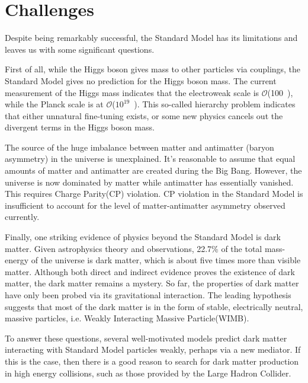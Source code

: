 \section{Challenges}
\par Despite being remarkably successful, the Standard Model has its limitations and leaves us with some significant questions.


\par First of all, while the Higgs boson gives mass to other particles via couplings, the Standard Model gives no prediction for
the Higgs boson mass. The current measurement of the Higgs mass indicates that the electroweak scale is $\mathcal{O}$(100~\GeV), 
while the Planck scale is at $\mathcal{O}$($10^{19}$~\GeV). This so-called hierarchy problem indicates that either unnatural fine-tuning exists, or some new physics cancels out the divergent terms in the Higgs boson mass.






\par The source of the huge imbalance between matter and antimatter (baryon asymmetry) in the universe is unexplained. 
It's reasonable to assume that equal amounts of matter and antimatter are created during the Big Bang. However, 
the universe is now dominated by matter while antimatter has essentially vanished. This requires Charge Parity(CP) violation.
CP violation in the Standard Model is insufficient to account for the level of matter-antimatter asymmetry observed currently.


\par Finally, one striking evidence of physics beyond the Standard Model is dark matter. Given astrophysics theory and observations, 
22.7\% of the total mass-energy of the universe is dark matter, which is about five times more than visible matter. 
Although both direct and indirect evidence proves the existence of dark matter, the dark matter remains a mystery. 
So far, the properties of dark matter have only been probed via its gravitational interaction. The leading hypothesis suggests that 
most of the dark matter is in the form of stable, electrically neutral, massive particles, i.e. Weakly Interacting Massive Particle(WIMB).


\par To answer these questions, several well-motivated models predict dark matter interacting with Standard Model particles weakly, perhaps via a new mediator. If this is the case, then there is a good reason to search for dark matter production in high energy collisions, such as those provided by the Large Hadron Collider.